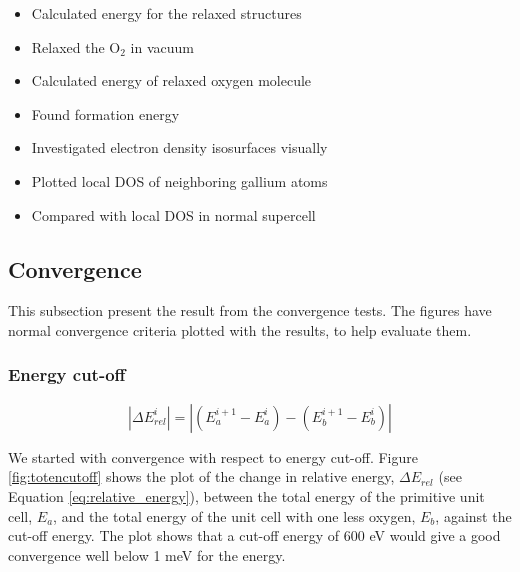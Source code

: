 \begin{itemize}
\item Calculated energy for the relaxed structures

\item Relaxed the O$_2$ in vacuum

\item Calculated energy of relaxed oxygen molecule

\item Found formation energy 

\item Investigated electron density isosurfaces visually

\item Plotted local DOS of neighboring gallium atoms

\item Compared with local DOS in normal supercell


\end{itemize}

\subsection{Convergence}

This subsection present the result from the convergence tests. The figures have normal convergence criteria plotted with the results, to help evaluate them. 

\subsubsection{Energy cut-off}

\begin{equation}\label{eq:relative_energy}
|\Delta E_{rel}^i| =\left| \left( E_a^{i+1}-E_a^i\right)-\left( E_b^{i+1}-E_b^i\right)\right|
\end{equation}

We started with convergence with respect to energy cut-off. Figure \ref{fig:totencutoff} shows the plot of the change in relative energy, $\Delta E_{rel}$ (see Equation \ref{eq:relative_energy}), between the total energy of the primitive unit cell, $E_a$, and the total energy of the unit cell with one less oxygen, $E_b$, against the cut-off energy. The plot shows that a cut-off energy of 600 eV would give a good convergence well below 1 meV for the energy.

